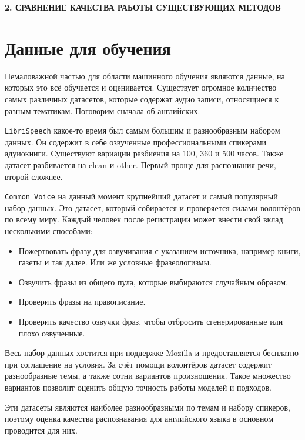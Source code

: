 \newpage
\begin{center}
  \textbf{\large 2. СРАВНЕНИЕ КАЧЕСТВА РАБОТЫ СУЩЕСТВУЮЩИХ МЕТОДОВ}
\end{center}

\section{Данные для обучения}

Немаловажной частью для области машинного обучения являются данные, на которых это всё обучается и оценивается.
Существует огромное количество самых различных датасетов, которые содержат аудио записи, относящиеся  к разным тематикам.
Поговорим сначала об английских.

\texttt{LibriSpeech} какое-то время был самым большим и разнообразным набором данных.
Он содержит в себе озвученные профессиональными спикерами адуиокниги.
Существуют вариации разбиения на 100, 360 и 500 часов.
Также датасет разбивается на clean и other.
Первый проще для распознания речи, второй сложнее.

\texttt{Common Voice} на данный момент крупнейший датасет и самый популярный набор данных.
Это датасет, который собирается и проверяется силами волонтёров по всему миру.
Каждый человек после регистрации может  внести свой вклад несколькими способами:
\begin{itemize}
  \item Пожертвовать фразу для озвучивания с указанием источника, например книги, газеты и так далее.
    Или же условные фразеологизмы.
  \item Озвучить фразы из общего пула, которые выбираются случайным образом.
  \item Проверить фразы на правописание.
  \item Проверить качество озвучки фраз, чтобы отбросить сгенерированные или плохо озвученные.
\end{itemize}
Весь набор данных хостится при поддержке Mozilla и предоставляется бесплатно при соглашение на условия.
За счёт помощи волонтёров датасет содержит разнообразные темы, а также сотни вариантов произношения.
Такое множество вариантов позволит оценить общую точность работы моделей и подходов.

Эти датасеты являются наиболее разнообразными по темам и набору спикеров, поэтому оценка качества распознавания для английского языка в основном проводится для них.

